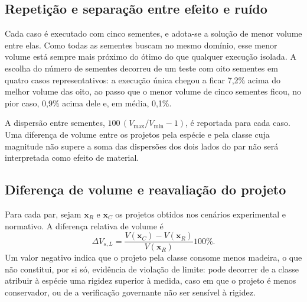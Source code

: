 \subsection{Repetição e separação entre efeito e ruído}\label{sec:sementes}

Cada caso é executado com cinco sementes, e adota-se a solução de menor volume entre elas. Como todas as sementes buscam no mesmo domínio, esse menor volume está sempre mais próximo do ótimo do que qualquer execução isolada. A escolha do número de sementes decorreu de um teste com oito sementes em quatro casos representativos: a execução única chegou a ficar 7,2\% acima do melhor volume das oito, ao passo que o menor volume de cinco sementes ficou, no pior caso, 0,9\% acima dele e, em média, 0,1\%.

A dispersão entre sementes, $100\,(V_{\max}/V_{\min}-1)$, é reportada para cada caso. Uma diferença de volume entre os projetos pela espécie e pela classe cuja magnitude não supere a soma das dispersões dos dois lados do par não será interpretada como efeito de material.

\subsection{Diferença de volume e reavaliação do projeto}\label{sec:protocolo}

Para cada par, sejam $\mathbf{x}_R$ e $\mathbf{x}_C$ os projetos obtidos nos cenários experimental e normativo. A diferença relativa de volume é
\begin{equation}
\Delta V_{s,L}=\frac{V(\mathbf{x}_C)-V(\mathbf{x}_R)}{V(\mathbf{x}_R)}100\%.
\label{eq:deltaV}
\end{equation}
Um valor negativo indica que o projeto pela classe consome menos madeira, o que não constitui, por si só, evidência de violação de limite: pode decorrer de a classe atribuir à espécie uma rigidez superior à medida, caso em que o projeto é menos conservador, ou de a verificação governante não ser sensível à rigidez.

